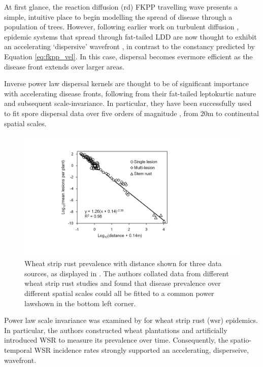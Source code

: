 At first glance, the reaction diffusion (\acrshort{rd}) FKPP travelling wave presents a simple, 
intuitive place to begin modelling the spread of disease through a population of trees.
However, following earlier work on turbulent diffusion \cite{scherm1996velocity},
epidemic systems that spread through fat-tailed LDD are now thought to exhibit an accelerating `dispersive' 
wavefront \cite{pybus2012unifying, cowger2005velocity},
in contrast to the constancy predicted by Equation \ref{eq:fkpp_vel}. In this case,
dispersal becomes evermore efficient as the disease front extends over larger areas.

Inverse power law dispersal kernels are thought to be of significant importance with accelerating disease
fronts, following from their fat-tailed leptokurtic nature and subsequent scale-invariance. In particular,
they have been successfully used to fit spore dispersal data over five orders of magnitude \cite{mundt2009long}, 
from $20\mathrm{m}$ to continental spatial scales. 

\begin{figure}
    \centering
    \includegraphics[scale=0.3]{chapter2/figures/multi-spread.pdf}
    \caption{Wheat strip rust prevalence with distance shown for three data sources, as displayed in \cite{severns2019consequences}.
             The authors collated data from different wheat strip rust studies and found that disease prevalence 
             over different spatial scales could all be fitted to a common power law\textemdash shown in the bottom left corner. 
    }
    \label{fig:WSR-prevelance}
\end{figure}

Power law scale invariance was examined by \cite{severns2019consequences} for wheat strip rust (\acrshort{wsr}) epidemics. 
In particular, the authors constructed wheat plantations and artificially introduced WSR to measure its prevalence over time. 
Consequently, the spatio-temporal WSR incidence rates strongly supported
an accelerating, disperseive, wavefront. 

